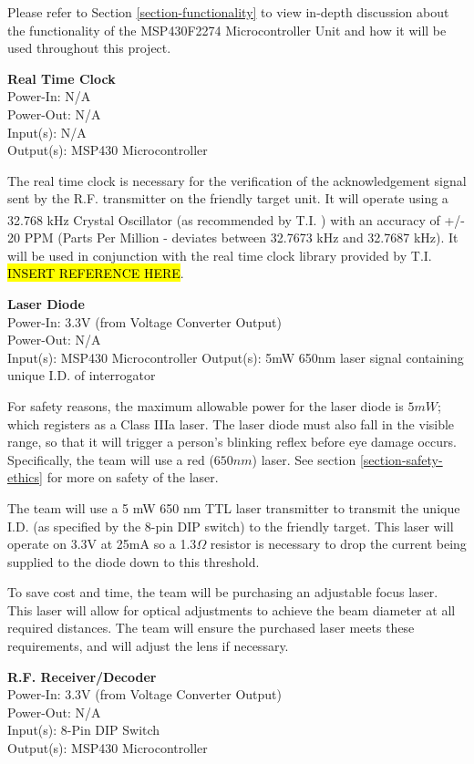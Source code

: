 \documentclass[letterpaper,10pt]{article}
\begin{document}
\begin{spacing}{1.15}
Please refer to Section \ref{section-functionality} to view in-depth discussion about the functionality of the MSP430F2274 Microcontroller Unit and how it will be used throughout this project.

\normalsize\textbf{Real Time Clock}\\
Power-In: N/A \\
Power-Out: N/A \\
Input(s): N/A \\
Output(s): MSP430 Microcontroller

The real time clock is necessary for the verification of the acknowledgement signal sent by the R.F. transmitter on the friendly target unit. It will operate using a 32.768 kHz Crystal Oscillator (as recommended by T.I. \textsuperscript{\cite{RTC-Implementation}}) with an accuracy of +/- 20 PPM (Parts Per Million - deviates between 32.7673 kHz and 32.7687 kHz). It will be used in conjunction with the real time clock library provided by T.I. \hl{INSERT REFERENCE HERE}.

\normalsize\textbf{Laser Diode}\\
Power-In: 3.3V (from Voltage Converter Output) \\
Power-Out: N/A \\
Input(s): MSP430 Microcontroller
Output(s):  5mW 650nm laser signal containing unique I.D. of interrogator 

For safety reasons, the maximum allowable power for the laser diode is $5mW$; which registers as a Class IIIa laser. The laser diode must also fall in the visible range, so that it will trigger a person's blinking reflex before eye damage occurs. Specifically, the team will use a red ($650nm$) laser. See section \ref{section-safety-ethics} for more on safety of the laser. 

The team will use a 5 mW 650 nm TTL laser transmitter to transmit the unique I.D. (as specified by the 8-pin DIP switch) to the friendly target. This laser will operate on 3.3V at 25mA so a 1.3$\Omega$  resistor is necessary to drop the current being supplied to the diode down to this threshold. 

To save cost and time, the team will be purchasing an adjustable focus laser. This laser will allow for optical adjustments to achieve the beam diameter at all required distances. The team will ensure the purchased laser meets these requirements, and will adjust the lens if necessary. 

\normalsize\textbf{R.F. Receiver/Decoder} \\
Power-In: 3.3V (from Voltage Converter Output) \\
Power-Out: N/A \\
Input(s): 8-Pin DIP Switch\\
Output(s): MSP430 Microcontroller


\end{spacing}
\end{document}
